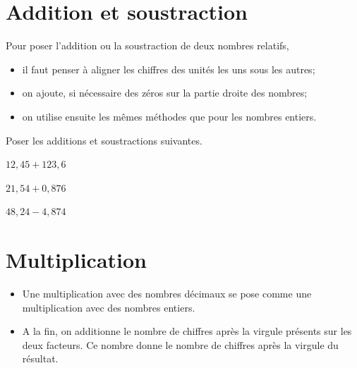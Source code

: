 \documentclass[a4paper]{book}
\begin{document}
\section{Addition et soustraction}
    \begin{methode}
        Pour poser l'addition ou la soustraction de deux nombres relatifs, 
        \begin{itemize}
            \item il faut penser à aligner les chiffres des unités les uns sous les autres;

            \item on ajoute, si nécessaire des zéros sur la partie droite des nombres;

            \item on utilise ensuite les mêmes méthodes que pour les nombres entiers.
        \end{itemize}
    \end{methode}


    \begin{exemple}
        Poser les additions et soustractions suivantes.

        \medskip

        \begin{minipage}{0.30\linewidth}
            $12,45+123,6$
            
            \vspace{2cm}
        \end{minipage}
        \hfill\vline\hfill
        \begin{minipage}{0.30\linewidth}
            $21,54+0,876$
            
            \vspace{2cm}
        \end{minipage}
        \hfill\vline\hfill
        \begin{minipage}{0.30\linewidth}
            $48,24-4,874$
            
            \vspace{2cm}
        \end{minipage}
    \end{exemple}


\newpage


\section{Multiplication}

    \begin{methode}
        \begin{itemize}
            \item Une multiplication avec des nombres décimaux se pose comme une multiplication avec des nombres entiers.

            \item A la fin, on additionne le nombre de chiffres après la virgule présents sur les deux facteurs. Ce nombre donne le nombre de chiffres après la virgule du résultat.
        \end{itemize}
    \end{methode}
\end{document}
